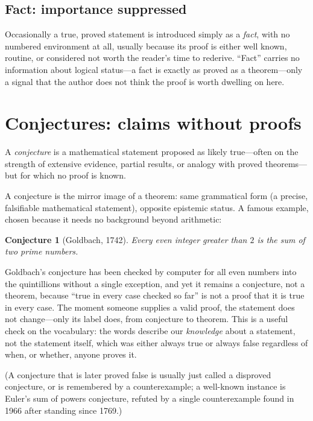 \documentclass{essay}
\newtheorem{conjecture}[theorem]{Conjecture}
\begin{document}
\subsection{Fact: importance suppressed}

Occasionally a true, proved statement is introduced simply as a \emph{fact}, with no numbered environment at all, usually because its proof is either well known, routine, or considered not worth the reader's time to rederive. ``Fact'' carries no information about logical status---a fact is exactly as proved as a theorem---only a signal that the author does not think the proof is worth dwelling on here.

\section{Conjectures: claims without proofs}

\begin{definition}[Conjecture]
A \emph{conjecture} is a mathematical statement proposed as likely true---often on the strength of extensive evidence, partial results, or analogy with proved theorems---but for which no proof is known.
\end{definition}

A conjecture is the mirror image of a theorem: same grammatical form (a precise, falsifiable mathematical statement), opposite epistemic status. A famous example, chosen because it needs no background beyond arithmetic:

\begin{conjecture}[Goldbach, 1742]
Every even integer greater than \(2\) is the sum of two prime numbers.
\end{conjecture}

Goldbach's conjecture has been checked by computer for all even numbers into the quintillions without a single exception, and yet it remains a conjecture, not a theorem, because ``true in every case checked so far'' is not a proof that it is true in every case. The moment someone supplies a valid proof, the statement does not change---only its label does, from conjecture to theorem. This is a useful check on the vocabulary: the words describe our \emph{knowledge} about a statement, not the statement itself, which was either always true or always false regardless of when, or whether, anyone proves it.

(A conjecture that is later proved false is usually just called a disproved conjecture, or is remembered by a counterexample; a well-known instance is Euler's sum of powers conjecture, refuted by a single counterexample found in 1966 after standing since 1769.)
\end{document}
